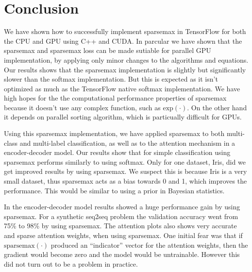 \section{Conclusion}

We have shown how to successfully implement sparsemax in TensorFlow for both the CPU and GPU using C++ and CUDA. In parcular we have shown that the sparsemax and sparsemax loss can be made sutiable for parallel GPU implementation, by applying only minor changes to the algorithms and equations. Our results shows that the sparsemax implementation is slightly but significantly slower than the softmax implementation. But this is expected as it isn't optimized as much as the TensorFlow native softmax implementation. We have high hopes for the the computational performance properties of sparsemax because it doesn't use any complex function, such as $\mathrm{exp}(\cdot)$. On the other hand it depends on parallel sorting algorithm, which is particually difficult for GPUs.

Using this sparsemax implementation, we have applied sparsemax to both multi-class and multi-label classification, as well as to the attention mechanism in a encoder-decoder model. Our results show that for simple classification using sparsemax performs similarly to using softmax. Only for one dataset, Iris, did we get improved results by using sparsemax. We suspect this is because Iris is a very small dataset, thus sparsemax acts as a bias towards 0 and 1, which improves the performance. This would be similar to using a prior in Bayesian statistics.

In the encoder-decoder model results showed a huge performance gain by using sparsemax. For a synthetic seq2seq problem the validation accuracy went from 75\% to 98\% by using sparsemax. The attention plots also shows very accurate and sparse attention weights, when using sparsemax. One initial fear was that if $\mathrm{sparsemax}(\cdot)$ produced an ``indicator'' vector for the attention weights, then the gradient would become zero and the model would be untrainable. However this did not turn out to be a problem in practice.